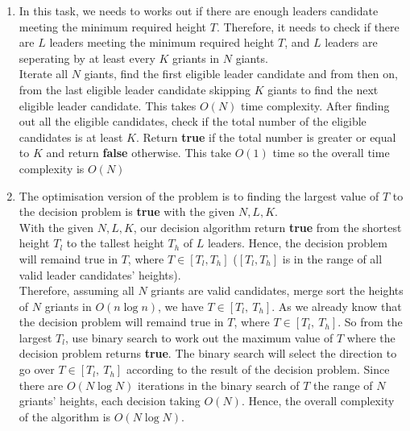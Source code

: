 \documentclass[a4paper]{scrartcl}
\begin{document}
\begin{enumerate}[label=(\alph*)]
  \item In this task, we needs to works out if there are enough leaders candidate meeting the minimum required height $T$. Therefore, it needs to check if there are $L$ leaders meeting the minimum required height $T$, and $L$ leaders are seperating by at least every $K$ griants in $N$ giants.\\
  Iterate all $N$ giants, find the first eligible leader candidate and from then on, from the last eligible leader candidate skipping $K$ giants to find the next eligible leader candidate. This takes $O(N)$ time complexity.
  After finding out all the eligible candidates, check if the total number of the eligible candidates is at least $K$. Return \textbf{true} if the total number is greater or equal to $K$ and return \textbf{false} otherwise. This take $O(1)$ time so the overall time complexity is $O(N)$
  \item The optimisation version of the problem is to finding the largest value of $T$ to the decision problem is {\bfseries true} with the given $N, L, K$.\\
  With the given $N, L, K$, our decision algorithm return \textbf{true} from the shortest height $T_{l}$ to the tallest height $T_{h}$ of $L$ leaders. Hence, the decision problem will remaind true in $T$, where $T \in [T_{l}, T_{h}]$ ($ [T_{l}, T_{h}]$ is in the range of all valid leader candidates' heights).\\
  Therefore, assuming all $N$ griants are valid candidates, merge sort the heights of $N$ griants in $O(n\log{n})$, we have $T \in [T_{l},\ T_{h}]$. As we already know that the decision problem will remaind true in $T$, where $T \in [T_{l},\ T_{h}]$. So from the largest $T_l$, use binary search to work out the maximum value of $T$ where the decision problem returns \textbf{true}. The binary search will select the direction to go over $T \in [T_{l},\ T_{h}]$ according to the result of the decision problem. Since there are $O(N\log{N})$ iterations in the binary search of $T$ the range of $N$ griants' heights, each decision taking $O(N)$. Hence, the overall complexity of the algorithm is $O(N\log{N})$.
\end{enumerate}
\end{document}
